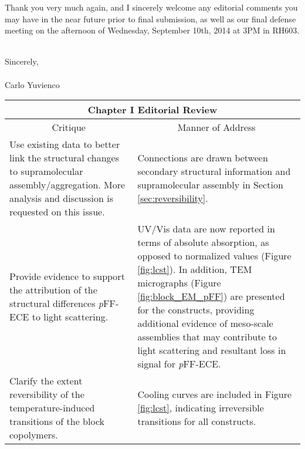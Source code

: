 Thank you very much again, and I sincerely welcome any editorial comments you
may have in the near future prior to final submission, as well as our final
defense meeting on the afternoon of Wednesday, September 10th, 2014 at 3PM in
RH603.

\hspace{0pt}\\
Sincerely,
\hspace{0pt}\\
\hspace{0pt}\\
Carlo Yuvienco

\begin{landscape}
\renewcommand{\arraystretch}{1.5}
\begin{table}[h!]
    \centering
    \begin{tabular}{ p{} p{} }
    \hline
    \multicolumn{2}{c}{Chapter I Editorial Review} \\
    \hline
    \multicolumn{1}{c}{Critique} &
    \multicolumn{1}{c}{Manner of Address} \\
    \hline
    
    Use existing data to better link the structural changes to supramolecular
    assembly/aggregation. More analysis and discussion is requested on this
    issue.
    &
    Connections are drawn between secondary structural information and
    supramolecular assembly in Section \ref{sec:reversibility}.
    \\

    Provide evidence to support the attribution of the structural differences
    \emph{p}FF-ECE to light scattering.
    &
    UV/Vis data are now reported in terms of absolute absorption, as opposed to
    normalized values (Figure \ref{fig:lcst}). In addition, TEM micrographs
    (Figure \ref{fig:block_EM_pFF}) are presented for the constructs, providing
    additional evidence of meso-scale assemblies that may contribute to light
    scattering and resultant loss in signal for \emph{p}FF-ECE.
    \\

    Clarify the extent reversibility of the temperature-induced transitions of
    the block copolymers.
    &
    Cooling curves are included in Figure \ref{fig:lcst}, indicating irreversible
    transitions for all constructs.
    \\


\end{tabular}
\end{table}
\end{landscape}
